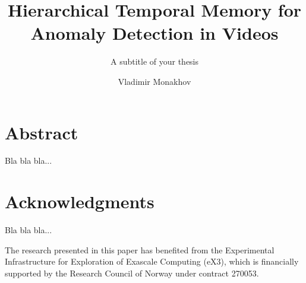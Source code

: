 \documentclass[USenglish]{ifimaster}  %
\title{Hierarchical Temporal Memory for Anomaly Detection in Videos}
\subtitle{A subtitle of your thesis }         %
\author{Vladimir Monakhov}                      %
\begin{document}
\duoforside[
  dept={Department of Informatics},   %
  program={Informatics: Robotics and Intelligent Systems},         %
  long
]                                        %

\frontmatter{}
\mainmatter{}

\chapter*{Abstract} 
Bla bla bla...
\chapter*{Acknowledgments} 
Bla bla bla...
\par
The research presented in this paper has benefited from the Experimental Infrastructure for Exploration of Exascale Computing (eX3), which is financially supported by the Research Council of Norway under contract 270053.

\tableofcontents
\mainmatter






\backmatter{}
\printbibliography
\end{document}
